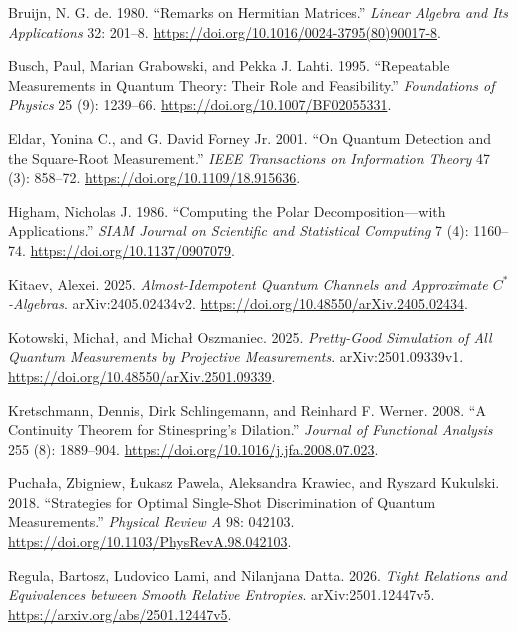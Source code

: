 \documentclass[
  11pt,
  a4paper,
]{article}
\newlength{\cslhangindent}
\newenvironment{CSLReferences}[2] %
 {\begin{list}{}{%
  \setlength{\itemindent}{0pt}
  \setlength{\leftmargin}{0pt}
  \setlength{\parsep}{0pt}
  \ifodd #1
   \setlength{\leftmargin}{\cslhangindent}
   \setlength{\itemindent}{-1\cslhangindent}
  \fi
  \setlength{\itemsep}{#2\baselineskip}}}
 {\end{list}}
\begin{document}
\protect{}\label{refs}
\begin{CSLReferences}{1}{1}
Bruijn, N. G. de. 1980. {``Remarks on {Hermitian} Matrices.''}
\emph{Linear Algebra and Its Applications} 32: 201--8.
\url{https://doi.org/10.1016/0024-3795(80)90017-8}.

Busch, Paul, Marian Grabowski, and Pekka J. Lahti. 1995. {``Repeatable
Measurements in Quantum Theory: Their Role and Feasibility.''}
\emph{Foundations of Physics} 25 (9): 1239--66.
\url{https://doi.org/10.1007/BF02055331}.

Eldar, Yonina C., and G. David Forney Jr. 2001. {``On Quantum Detection
and the Square-Root Measurement.''} \emph{IEEE Transactions on
Information Theory} 47 (3): 858--72.
\url{https://doi.org/10.1109/18.915636}.

Higham, Nicholas J. 1986. {``Computing the Polar Decomposition---with
Applications.''} \emph{SIAM Journal on Scientific and Statistical
Computing} 7 (4): 1160--74. \url{https://doi.org/10.1137/0907079}.

Kitaev, Alexei. 2025. \emph{Almost-Idempotent Quantum Channels and
Approximate {\(C^*\)}-Algebras}. arXiv:2405.02434v2.
\url{https://doi.org/10.48550/arXiv.2405.02434}.

Kotowski, Michał, and Michał Oszmaniec. 2025. \emph{Pretty-Good
Simulation of All Quantum Measurements by Projective Measurements}.
arXiv:2501.09339v1. \url{https://doi.org/10.48550/arXiv.2501.09339}.

Kretschmann, Dennis, Dirk Schlingemann, and Reinhard F. Werner. 2008.
{``A Continuity Theorem for {Stinespring}'s Dilation.''} \emph{Journal
of Functional Analysis} 255 (8): 1889--904.
\url{https://doi.org/10.1016/j.jfa.2008.07.023}.

Puchała, Zbigniew, Łukasz Pawela, Aleksandra Krawiec, and Ryszard
Kukulski. 2018. {``Strategies for Optimal Single-Shot Discrimination of
Quantum Measurements.''} \emph{Physical Review A} 98: 042103.
\url{https://doi.org/10.1103/PhysRevA.98.042103}.

Regula, Bartosz, Ludovico Lami, and Nilanjana Datta. 2026. \emph{Tight
Relations and Equivalences between Smooth Relative Entropies}.
arXiv:2501.12447v5. \url{https://arxiv.org/abs/2501.12447v5}.


\end{CSLReferences}
\end{document}
